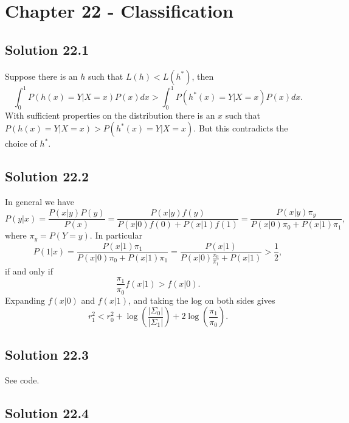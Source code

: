 \section*{Chapter 22 - Classification}

\subsection*{Solution 22.1}

Suppose there is an $h$ such that $L(h) < L(h^*)$, then
\begin{equation*}
    \int_0^1 P(h(x) = Y | X = x) P(x) dx > \int_0^1 P(h^*(x) = Y | X = x) P(x) dx.
\end{equation*}
With sufficient properties on the distribution there is an $x$ such that $P(h(x) = Y | X = x) > P(h^*(x) = Y | X = x)$.
But this contradicts the choice of $h^*$.


\subsection*{Solution 22.2}

In general we have
\begin{equation*}
    P(y|x) = \frac{P(x|y)P(y)}{P(x)}
        = \frac{P(x|y)f(y)}{P(x|0)f(0) + P(x|1)f(1)}
        = \frac{P(x|y) \pi_y}{P(x|0) \pi_0 + P(x|1) \pi_1},
\end{equation*}
where $\pi_y = P(Y = y)$.
In particular
\begin{equation*}
    P(1|x) = \frac{P(x|1) \pi_1}{P(x|0) \pi_0 + P(x|1) \pi_1}
        = \frac{P(x|1)}{P(x|0) \frac{\pi_0}{\pi_1} + P(x|1)}
        > \frac{1}{2},
\end{equation*}
if and only if
\begin{equation*}
    \frac{\pi_1}{\pi_0} f(x|1) > f(x|0).
\end{equation*}
Expanding $f(x|0)$ and $f(x|1)$, and taking the log on both sides gives
\begin{equation*}
    r_1^2 < r_0^2 + \log\left(\frac{|\Sigma_0|}{|\Sigma_1|}\right) + 2\log\left(\frac{\pi_1}{\pi_0}\right).
\end{equation*}


\subsection*{Solution 22.3}

See code.


\subsection*{Solution 22.4}

